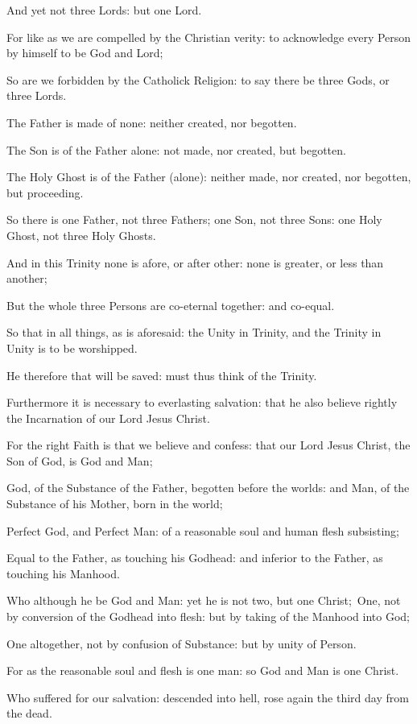 {And yet not three Lords: but one Lord.\par
For like as we are compelled by the Christian verity: to acknowledge every Person by himself to be God and Lord;\par
So are we forbidden by the Catholick Religion: to say there be three Gods, or three Lords.\par
The Father is made of none: neither created, nor begotten.\par
The Son is of the Father alone: not made, nor created, but begotten.\par
The Holy Ghost is of the Father (alone): neither made, nor created, nor begotten, but proceeding.\par
So there is one Father, not three Fathers; one Son, not three Sons: one Holy Ghost, not three Holy Ghosts.\par
And in this Trinity none is afore, or after other: none is greater, or less than another;\par
But the whole three Persons are co-eternal together: and co-equal.\par
So that in all things, as is aforesaid: the Unity in Trinity, and the Trinity in Unity is to be worshipped.\par
He therefore that will be saved: must thus think of the Trinity.
\par
Furthermore it is necessary to everlasting salvation: that he also believe rightly the Incarnation of our Lord Jesus Christ.\par
For the right Faith is that we believe and confess: that our Lord Jesus Christ, the Son of God, is God and Man;\par
God, of the Substance of the Father, begotten before the worlds: and Man, of the Substance of his Mother, born in the world;\par
Perfect God, and Perfect Man: of a reasonable soul and human flesh subsisting;\par
Equal to the Father, as touching his Godhead: and inferior to the Father, as touching his Manhood.\par
Who although he be God and Man: yet he is not two, but one Christ;\
One, not by conversion of the Godhead into flesh: but by taking of the Manhood into God;\par
One altogether, not by confusion of Substance: but by unity of Person.\par
For as the reasonable soul and flesh is one man: so God and Man is one Christ.\par
Who suffered for our salvation: descended into hell, rose again the third day from the dead.\par
}
